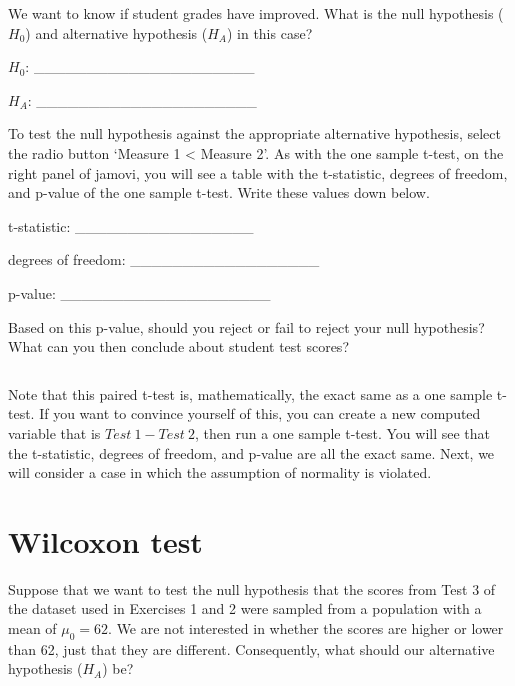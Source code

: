 \documentclass[
]{scrbook}
\begin{document}
\begin{verbatim}
\end{verbatim}

We want to know if student grades have improved.
What is the null hypothesis (\(H_{0}\)) and alternative hypothesis (\(H_{A}\)) in this case?

\(H_{0}\): \_\_\_\_\_\_\_\_\_\_\_\_\_\_\_\_\_\_\_\_\_

\(H_{A}\): \_\_\_\_\_\_\_\_\_\_\_\_\_\_\_\_\_\_\_\_\_

To test the null hypothesis against the appropriate alternative hypothesis, select the radio button `Measure 1 \textless{} Measure 2'.
As with the one sample t-test, on the right panel of jamovi, you will see a table with the t-statistic, degrees of freedom, and p-value of the one sample t-test.
Write these values down below.

t-statistic: \_\_\_\_\_\_\_\_\_\_\_\_\_\_\_\_\_

degrees of freedom: \_\_\_\_\_\_\_\_\_\_\_\_\_\_\_\_\_\_

p-value: \_\_\_\_\_\_\_\_\_\_\_\_\_\_\_\_\_\_\_\_

Based on this p-value, should you reject or fail to reject your null hypothesis?
What can you then conclude about student test scores?

\begin{verbatim}
\end{verbatim}

Note that this paired t-test is, mathematically, the exact same as a one sample t-test.
If you want to convince yourself of this, you can create a new computed variable that is \(Test\:1 - Test\:2\), then run a one sample t-test.
You will see that the t-statistic, degrees of freedom, and p-value are all the exact same.
Next, we will consider a case in which the assumption of normality is violated.

\hypertarget{wilcoxon-test-1}{%
\section{Wilcoxon test}\label{wilcoxon-test-1}}

Suppose that we want to test the null hypothesis that the scores from Test 3 of the dataset used in Exercises 1 and 2 were sampled from a population with a mean of \(\mu_{0} = 62\).
We are not interested in whether the scores are higher or lower than 62, just that they are different.
Consequently, what should our alternative hypothesis (\(H_{A}\)) be?
\end{document}
